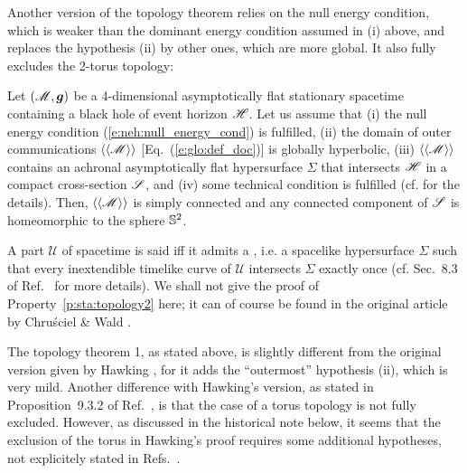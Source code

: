 Another version of the topology theorem relies on the null energy
condition, which is weaker than the dominant energy condition assumed in (i) above,
and replaces the hypothesis (ii) by other ones, which are more global. It also
fully excludes the 2-torus topology:

\begin{prop}
\label{p:sta:topology2}
Let $(\mathscr{M}, \bm{g})$ be a 4-dimensional asymptotically flat stationary spacetime
containing a black hole of event horizon $\mathscr{H}$.
Let us assume that (i) the
null energy condition (\ref{e:neh:null_energy_cond}) is fulfilled,
(ii) the domain of outer communications $\langle\langle \mathscr{M}\rangle\rangle$
[Eq.~(\ref{e:glo:def_doc})]
is globally hyperbolic,
(iii) $\langle\langle \mathscr{M}\rangle\rangle$ contains an achronal asymptotically
flat hypersurface $\Sigma$ that intersects $\mathscr{H}$ in a compact cross-section $\mathscr{S}$,
and (iv) some technical condition is fulfilled (cf. \cite{ChrusW94b} for the details).
Then, $\langle\langle \mathscr{M}\rangle\rangle$ is simply connected and
any connected component of $\mathscr{S}$ is homeomorphic to the sphere $\mathbb{S}^2$.
\end{prop}
A part $\mathscr{U}$ of spacetime is said
\label{d:sta:glob_hyperbol}
iff it admits a \label{d:sta:Cauchy_surface}, i.e. a spacelike
hypersurface $\Sigma$ such that every inextendible timelike curve of $\mathscr{U}$
intersects $\Sigma$ exactly once (cf. Sec.~8.3 of Ref.~\cite{Wald84} for more
details). We shall not give the proof of Property~\ref{p:sta:topology2} here; it can of course
be found in the original article by Chru\'sciel \& Wald \cite{ChrusW94b}.

\begin{remark}
The topology theorem 1, as stated above, is slightly different from the original
version given by Hawking \cite{Hawki72,Hawki73,HawkiE73}, for it adds the ``outermost'' hypothesis (ii),
which is very mild. Another difference with Hawking's version,
as stated in Proposition~9.3.2 of Ref.~\cite{HawkiE73}, is that
the case of a torus topology is not fully excluded. However, as discussed in
the historical note below, it seems that the exclusion of the torus in
Hawking's proof requires some additional hypotheses, not explicitely stated
in Refs.~\cite{Hawki72,HawkiE73}.
\end{remark}

